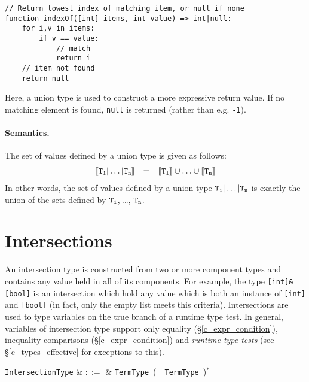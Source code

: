 \begin{lstlisting}
// Return lowest index of matching item, or null if none
function indexOf([int] items, int value) => int|null:
    for i,v in items:
        if v == value:
            // match
            return i
    // item not found
    return null
\end{lstlisting}

Here, a union type is used to construct a more expressive return value.  If no matching element is found, \lstinline{null} is returned (rather than e.g. \lstinline{-1}).

\paragraph{Semantics.}  The set of values defined by a union type is given as follows:
\begin{displaymath}
\begin{array}{rcl}
{\tt\llbracket T_1|\ldots|T_n\rrbracket} & = & {\tt \llbracket T_1\rrbracket\cup\ldots\cup \llbracket T_n\rrbracket}\\
\end{array}
\end{displaymath}
In other words, the set of values defined by a union type ${\tt T_1|\ldots|T_n}$ is exactly the union of the sets defined by ${\tt T_1}$, \ldots, ${\tt T_n}$.


\section{Intersections}
\label{c_types_intersections}

An intersection type is constructed from two or more component types and contains any value held in all of its components.  For example, the type \lstinline{[int]&[bool]} is an intersection which hold any value which is both an instance of \lstinline{[int]} and \lstinline{[bool]} (in fact, only the empty list meets this criteria).  Intersections are used to type variables on the true branch of a runtime type test.  In general, variables of intersection type support only equality (\S\ref{c_expr_condition}), inequality comparisons (\S\ref{c_expr_condition}) and {\em runtime type tests} (see \S\ref{c_types_effective} for exceptions to this).

\begin{syntax}
  \verb+IntersectionType+ & $::=$ & \verb+TermType+\ \big(\ \token{\&}\ \verb+TermType+\
  \big)$^*$\\
\end{syntax}

